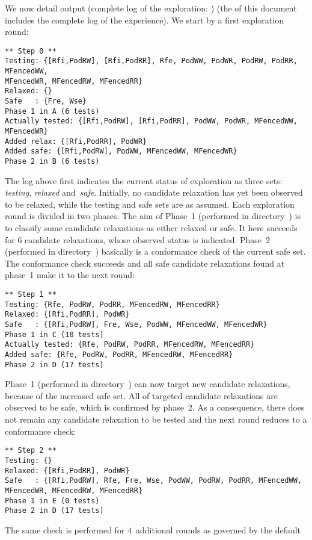 We now detail \dont{} output
\ifhevea (complete log of the exploration: )
\else (the 
of this document includes the complete log of the experience)\fi.
We start by a first exploration round:
\begin{verbatim}
** Step 0 **
Testing: {[Rfi,PodRW], [Rfi,PodRR], Rfe, PodWW, PodWR, PodRW, PodRR, MFencedWW, 
MFencedWR, MFencedRW, MFencedRR}
Relaxed: {}
Safe   : {Fre, Wse}
Phase 1 in A (6 tests)
Actually tested: {[Rfi,PodRW], [Rfi,PodRR], PodWW, PodWR, MFencedWW, MFencedWR}
Added relax: {[Rfi,PodRR], PodWR}
Added safe: {[Rfi,PodRW], PodWW, MFencedWW, MFencedWR}
Phase 2 in B (6 tests)
\end{verbatim}
The log above first indicates the current status of exploration
as three sets: \emph{testing}, \emph{relaxed} and~\emph{safe}.
Initially, no candidate relaxation has yet been observed to be relaxed,
while the testing and safe sets are as assumed.
Each exploration round is divided in two phases.
The aim of Phase~1 (performed in directory~)
is to classify some candidate relaxations as either relaxed or safe.
It here
succeeds for 6 candidate relaxations, whose observed status is indicated.
Phase~2 (performed in directory~)
basically is a conformance check of the current safe set.
The conformance check succeeds and all safe candidate relaxations
found at phase~1 make it to the next round:
\begin{verbatim}
** Step 1 **
Testing: {Rfe, PodRW, PodRR, MFencedRW, MFencedRR}
Relaxed: {[Rfi,PodRR], PodWR}
Safe   : {[Rfi,PodRW], Fre, Wse, PodWW, MFencedWW, MFencedWR}
Phase 1 in C (10 tests)
Actually tested: {Rfe, PodRW, PodRR, MFencedRW, MFencedRR}
Added safe: {Rfe, PodRW, PodRR, MFencedRW, MFencedRR}
Phase 2 in D (17 tests)
\end{verbatim}
Phase~1 (performed in directory~)
can now target new candidate relaxations, because of the increased
safe set. All of targeted candidate relaxations
are observed to be safe, which is confirmed
by phase~2. As a  consequence, there does not remain
any candidate relaxation to be tested and the next round reduces
to a conformance check:
\begin{verbatim}
** Step 2 **
Testing: {}
Relaxed: {[Rfi,PodRR], PodWR}
Safe   : {[Rfi,PodRW], Rfe, Fre, Wse, PodWW, PodRW, PodRR, MFencedWW, MFencedWR, MFencedRW, MFencedRR}
Phase 1 in E (0 tests)
Phase 2 in D (17 tests)
\end{verbatim}
The same check is performed
for $4$~additional rounds as governed by the default
